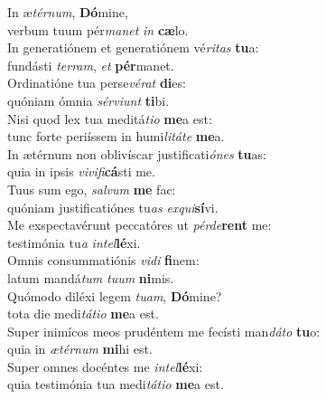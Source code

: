 \oddverse In æ\textit{tér}\textit{num}, \textbf{Dó}mine,~\*\\
\oddverse verbum tuum pér\textit{ma}\textit{net} \textit{in} \textbf{cæ}lo.\\
\evenverse In generatiónem et generatiónem vé\textit{ri}\textit{tas} \textbf{tu}a:~\*\\
\evenverse fundásti \textit{ter}\textit{ram}, \textit{et} \textbf{pér}manet.\\
\oddverse Ordinatióne tua perse\textit{vé}\textit{rat} \textbf{di}es:~\*\\
\oddverse quóniam ómnia \textit{sér}\textit{vi}\textit{unt} \textbf{ti}bi.\\
\evenverse Nisi quod lex tua meditá\textit{ti}\textit{o} \textbf{me}a est:~\*\\
\evenverse tunc forte periíssem in humi\textit{li}\textit{tá}\textit{te} \textbf{me}a.\\
\oddverse In ætérnum non oblivíscar justificati\textit{ó}\textit{nes} \textbf{tu}as:~\*\\
\oddverse quia in ipsis \textit{vi}\textit{vi}\textit{fi}\textbf{cá}sti me.\\
\evenverse Tuus sum ego, \textit{sal}\textit{vum} \textbf{me} fac:~\*\\
\evenverse quóniam justificatiónes tu\textit{as} \textit{ex}\textit{qui}\textbf{sí}vi.\\
\oddverse Me exspectavérunt peccatóres ut \textit{pér}\textit{de}\textbf{rent} me:~\*\\
\oddverse testimónia tu\textit{a} \textit{in}\textit{tel}\textbf{lé}xi.\\
\evenverse Omnis consummatiónis \textit{vi}\textit{di} \textbf{fi}nem:~\*\\
\evenverse latum mandá\textit{tum} \textit{tu}\textit{um} \textbf{ni}mis.\\
\oddverse Quómodo diléxi legem \textit{tu}\textit{am}, \textbf{Dó}mine?~\*\\
\oddverse tota die medi\textit{tá}\textit{ti}\textit{o} \textbf{me}a est.\\
\evenverse Super inimícos meos prudéntem me fecísti man\textit{dá}\textit{to} \textbf{tu}o:~\*\\
\evenverse quia in \textit{æ}\textit{tér}\textit{num} \textbf{mi}hi est.\\
\oddverse Super omnes docéntes me \textit{in}\textit{tel}\textbf{lé}xi:~\*\\
\oddverse quia testimónia tua medi\textit{tá}\textit{ti}\textit{o} \textbf{me}a est.\\
